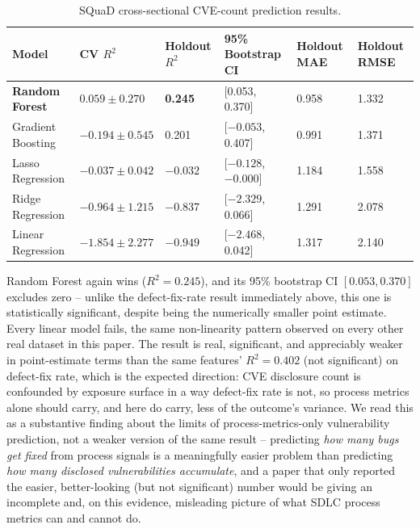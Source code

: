 \documentclass[technologies,article,submit,pdftex,moreauthors]{Definitions/mdpi}
\begin{document}
{\def\LTcaptype{none} %
\begin{table}[H]
\centering
\caption{SQuaD cross-sectional CVE-count prediction results.\label{tab:squad_vuln}}
\begin{tabularx}{\linewidth}{LLLLLL}
\toprule
\textbf{Model} & \textbf{CV \(R^2\)} & \textbf{Holdout \(R^2\)} & \textbf{95\% Bootstrap CI} & \textbf{Holdout MAE} & \textbf{Holdout RMSE} \\
\midrule
\textbf{Random Forest} & \(0.059 \pm 0.270\) & \textbf{0.245} & [0.053, 0.370] & 0.958 & 1.332 \\
Gradient Boosting & \(-0.194 \pm 0.545\) & 0.201 & [\(-0.053\), 0.407] & 0.991 & 1.371 \\
Lasso Regression & \(-0.037 \pm 0.042\) & \(-0.032\) & [\(-0.128\), \(-0.000\)] & 1.184 & 1.558 \\
Ridge Regression & \(-0.964 \pm 1.215\) & \(-0.837\) & [\(-2.329\), 0.066] & 1.291 & 2.078 \\
Linear Regression & \(-1.854 \pm 2.277\) & \(-0.949\) & [\(-2.468\), 0.042] & 1.317 & 2.140 \\
\bottomrule
\end{tabularx}
\end{table}
}

Random Forest again wins (\(R^2 = 0.245\)), and its 95\% bootstrap CI
\([0.053, 0.370]\) excludes zero -- unlike the defect-fix-rate result
immediately above, this one is statistically significant, despite being
the numerically smaller point estimate. Every linear model
fails, the same non-linearity pattern observed on every other real
dataset in this paper. The result is real, significant, and appreciably weaker in point-estimate terms than
the same features' \(R^2 = 0.402\) (not significant) on defect-fix rate, which is the
expected direction: CVE disclosure count is confounded by exposure
surface in a way defect-fix rate is not, so process metrics alone should
carry, and here do carry, less of the outcome's variance. We read this
as a substantive finding about the limits of process-metrics-only
vulnerability prediction, not a weaker version of the same result --
predicting \emph{how many bugs get fixed} from process signals is a
meaningfully easier problem than predicting \emph{how many disclosed
vulnerabilities accumulate}, and a paper that only reported the easier,
better-looking (but not significant) number would be giving an incomplete
and, on this evidence, misleading picture of what SDLC
process metrics can and cannot do.
\end{document}
